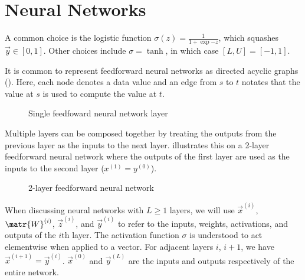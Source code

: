 




\section{Neural Networks}

A common choice is the logistic function $\sigma(z)
= \frac{1}{1+\exp{-z}}$, which squashes $\vec{y} \in [0, 1]$. Other choices
include $\sigma = \tanh$, in which case $[L, U] = [-1, 1]$.

It is common to represent feedforward neural networks as directed acyclic
graphs (). Here, each node denotes a data value and
an edge from $s$ to $t$ notates that the value at $s$ is used to compute the
value at $t$.

\begin{figure}[tb]
    \centering
    
    \caption{Single feedfoward neural network layer}
    \label{fig:nn-layer}
\end{figure}

Multiple layers can be composed together by treating the outputs from the previous layer
as the inputs to the next layer.  illustrates this on a 2-layer
feedforward neural network where the outputs of the first layer are used as the
inputs to the second layer (\ie $x^{(1)} = y^{(0)}$).


\begin{figure}[htbp]
    \centering
    
    \caption{2-layer feedforward neural network}
    \label{fig:ffw-nn}
\end{figure}

When discussing neural networks with $L \geq 1$ layers, we will use
$\vec{x}^{(i)}$, $\matr{W}^{(i)}$, $\vec{z}^{(i)}$, and $\vec{y}^{(i)}$ to
refer to the inputs, weights, activations, and outputs of the $i$th layer. The
activation function $\sigma$ is understood to act elementwise when applied to a
vector. For adjacent layers $i$, $i+1$, we have $\vec{x}^{(i+1)} =
\vec{y}^{(i)}$. $\vec{x}^{(0)}$ and $\vec{y}^{(L)}$ are the inputs and outputs
respectively of the entire network.

